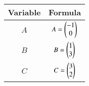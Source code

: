 \begin{center}
    \begin{tabular}{|c|c|} 
        \hline
            \textbf{Variable}  & \textbf{Formula} \\ 
        \hline
            $A$   & $A = \begin{pmatrix}-1 \\ 0\end{pmatrix}$ \\ 
        \hline
            $B$   &  $B = \begin{pmatrix}1 \\ 3\end{pmatrix}$\\ 
        \hline
          $C$   &  $C = \begin{pmatrix}3 \\ 2\end{pmatrix}$\\ 
        \hline
           \end{tabular}
\end{center}  
